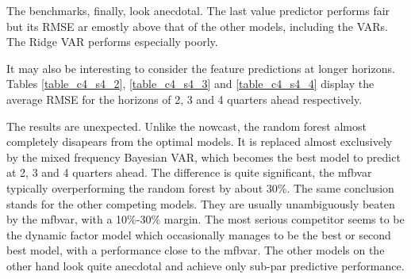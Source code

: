 The benchmarks, finally, look anecdotal. The last value predictor performs fair but its RMSE ar emostly above that of the other models, including the VARs. The Ridge VAR performs especially poorly.

It may also be interesting to consider the feature predictions at longer horizons. Tables \ref{table_c4_s4_2}, \ref{table_c4_s4_3} and \ref{table_c4_s4_4} display the average RMSE for the horizons of 2, 3 and 4 quarters ahead respectively.

The results are unexpected. Unlike the nowcast, the random forest almost completely disapears from the optimal models. It is replaced almost exclusively by the mixed frequency Bayesian VAR, which becomes the best model to predict at 2, 3 and 4 quarters ahead. The difference is quite significant, the mfbvar typically overperforming the random forest by about 30\%. The same conclusion stands for the other competing models. They are usually unambiguously beaten by the mfbvar, with a 10\%-30\% margin. The most serious competitor seems to be the dynamic factor model which occasionally manages to be the best or second best model, with a performance close to the mfbvar. The other models on the other hand look quite anecdotal and achieve only sub-par predictive performance.

\newpage

